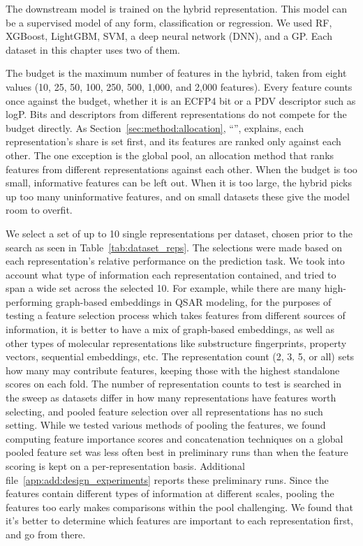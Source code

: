 The downstream model is trained on the hybrid representation. This model can be a supervised model of any form, classification or regression. We used RF, XGBoost, LightGBM, SVM, a deep neural network (DNN), and a GP. Each dataset in this chapter uses two of them. 

The budget is the maximum number of features in the hybrid, taken from eight values (10, 25, 50, 100, 250, 500, 1,000, and 2,000 features). Every feature counts once against the budget, whether it is an ECFP4 bit or a PDV descriptor such as logP. Bits and descriptors from different representations do not compete for the budget directly. As Section~\ref{sec:method:allocation}, ``'', explains, each representation's share is set first, and its features are ranked only against each other. The one exception is the global pool, an allocation method that ranks features from different representations against each other. When the budget is too small, informative features can be left out. When it is too large, the hybrid picks up too many uninformative features, and on small datasets these give the model room to overfit.

We select a set of up to 10 single representations per dataset, chosen prior to the search as seen in Table~\ref{tab:dataset_reps}. The selections were made based on each representation's relative performance on the prediction task. We took into account what type of information each representation contained, and tried to span a wide set across the selected 10. For example, while there are many high-performing graph-based embeddings in QSAR modeling, for the purposes of testing a feature selection process which takes features from different sources of information, it is better to have a mix of graph-based embeddings, as well as other types of molecular representations like substructure fingerprints, property vectors, sequential embeddings, etc.  The representation count (2, 3, 5, or all) sets how many may contribute features, keeping those with the highest standalone scores on each fold. The number of representation counts to test is searched in the sweep as datasets differ in how many representations have features worth selecting, and pooled feature selection over all representations has no such setting. While we tested various methods of pooling the features, we found computing feature importance scores and concatenation techniques on a global pooled feature set was less often best in preliminary runs than when the feature scoring is kept on a per-representation basis. Additional file~\ref{app:add:design_experiments} reports these preliminary runs. Since the features contain different types of information at different scales, pooling the features too early makes comparisons within the pool challenging. We found that it's better to determine which features are important to each representation first, and go from there.

